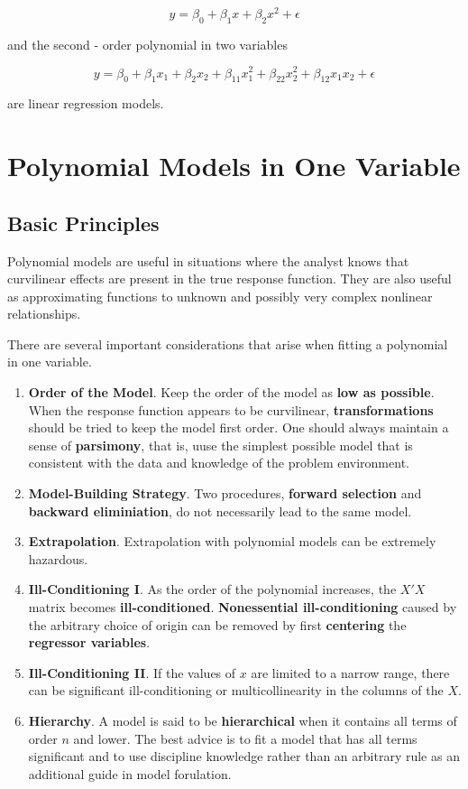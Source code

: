 \documentclass[12pt]{article}
\begin{document}
$$
y = \beta_0 + \beta_1 x + \beta_2 x^2 + \epsilon
$$

and the second - order polynomial in two variables

$$
y = \beta_0 + \beta_1 x_1 + \beta_2 x_2 + \beta_{11} x_1^2 + \beta_{22} x_2^2 + \beta_{12} x_1x_2 + \epsilon
$$

are linear regression models.

\section{Polynomial Models in One Variable}

\subsection{Basic Principles}

Polynomial models are useful in situations where the analyst knows that curvilinear effects are present in the true response function. They are also useful as approximating functions to unknown and possibly very complex nonlinear relationships. 

There are several important considerations that arise when fitting a polynomial in one variable. 

\begin{enumerate}
  \item \textbf{Order of the Model}. Keep the order of the model as \textbf{low as possible}. When the response function appears to be curvilinear, \textbf{transformations} should be tried to keep the model first order. One should always maintain a sense of \textbf{parsimony}, that is, uuse the simplest possible model that is consistent with the data and knowledge of the problem environment.
  \item \textbf{Model-Building Strategy}. Two procedures, \textbf{forward selection} and \textbf{backward eliminiation}, do not necessarily lead to the same model. 
  \item \textbf{Extrapolation}. Extrapolation with polynomial models can be extremely hazardous.
  \item \textbf{Ill-Conditioning I}. As the order of the polynomial increases, the $X'X$ matrix becomes \textbf{ill-conditioned}. \textbf{Nonessential ill-conditioning} caused by the arbitrary choice of origin can be removed by first \textbf{centering} the \textbf{regressor variables}. 
  \item \textbf{Ill-Conditioning II}. If the values of $x$ are limited to a narrow range, there can be significant ill-conditioning or multicollinearity in the columns of the $X$. 
  \item \textbf{Hierarchy}. A model is said to be \textbf{hierarchical} when it contains all terms of order $n$ and lower. The best advice is to fit a model that has all terms significant and to use discipline knowledge rather than an arbitrary rule as an additional guide in model forulation. 
\end{enumerate}
\end{document}

